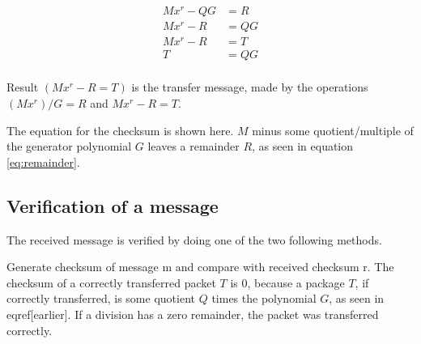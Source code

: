 \begin{align}
	Mx^r - QG &= R \label{eq:remainder} \\
	Mx^r - R  &= QG \\
	Mx^r - R  &= T \\
	T &= QG \\
\end{align}

Result $(Mx^r - R = T)$ is the transfer message, made by the operations $(Mx^r) / G = R$ and $Mx^r - R = T$.

The equation for the checksum is shown here. $M$ minus some quotient/multiple of the generator polynomial $G$ leaves a remainder $R$, as seen in equation \ref{eq:remainder}. 

\subsection{Verification of a message}
The received message is verified by doing one of the two following methods. 

Generate checksum of message m and compare with received checksum r.
The checksum of a correctly transferred packet $T$ is 0, because a package $T$, if correctly transferred, is some quotient $Q$ times the polynomial $G$, as seen in eqref[earlier]. If a division has a zero remainder, the packet was transferred correctly.

